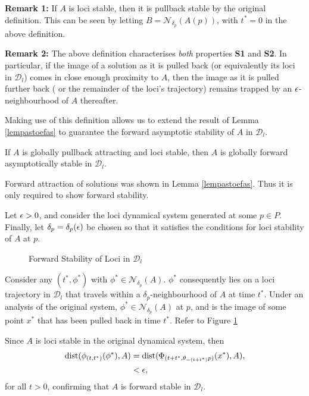 \textbf{Remark 1:} If $A$ is loci stable, then it is
pullback stable by the original definition. This can be seen by
letting $B = \mathcal{N}_{\delta_p}(A(p))$, with $t^* = 0$ in the above
definition.

\textbf{Remark 2:} The above definition characterises \textit{both} properties
\textbf{S1} and \textbf{S2}. In particular, if the image of a solution as it is
pulled back (or equivalently its loci in $\mathcal{D}_l$) comes in close enough
proximity to $A$, then the image as it is pulled further back ( or the remainder
of the loci's trajectory) remains trapped by an $\epsilon$-neighbourhood of $A$
thereafter.

Making use of this definition allows us to extend the result of Lemma
\ref{lempastoefas} to guarantee the forward asymptotic stability of $A$ in
$\mathcal{D}_l$.

\begin{therm}
\label{thmpastofas}
If $A$ is globally pullback attracting and loci stable, then
$A$ is globally forward asymptotically stable in $\mathcal{D}_l$.
\end{therm}
\begin{prf}
Forward attraction of solutions was shown in Lemma \ref{lempastoefas}.
Thus it is only required to show forward stability.

Let $\epsilon >0$, and consider the loci dynamical system generated at
some $p \in P$. Finally, let $\delta_p = \delta_p(\epsilon)$ be chosen so that it
satisfies the conditions for loci stability of $A$ at $p$.

\begin{figure}[htb]
\begin{center}
 \caption{Forward Stability of Loci in $\mathcal{D}_l$}
\protect\label{loci5}
\end{center}
\end{figure}

Consider any $(t^*, \phi^*)$ with $\phi^* \in \mathcal{N}_{\delta_p}(A)$.
$\phi^*$ consequently lies on a loci trajectory in $\mathcal{D}_l$ that travels
within a $\delta_p$-neighbourhood of $A$ at time $t^*$. Under an analysis of the
original system, $\phi^* \in \mathcal{N}_{\delta_p}(A)$ at $p$, and is the image
of some point  $x^*$ that has been pulled back in time $t^*$. Refer to Figure
\ref{loci5}

Since $A$ is loci stable in the original dynamical system, then
\begin{align*}
 {\rm dist}(\phi_{(t, t^*)}(\phi^*), A) &=  {\rm dist}( \Phi_{(t + t^*,
                  \theta_{-(t+t^*)}p)}(x^*), A), \\
                  &< \epsilon, \\
\end{align*}
for all $t > 0$, confirming that $A$ is forward stable in $\mathcal{D}_l$.
\end{prf}


